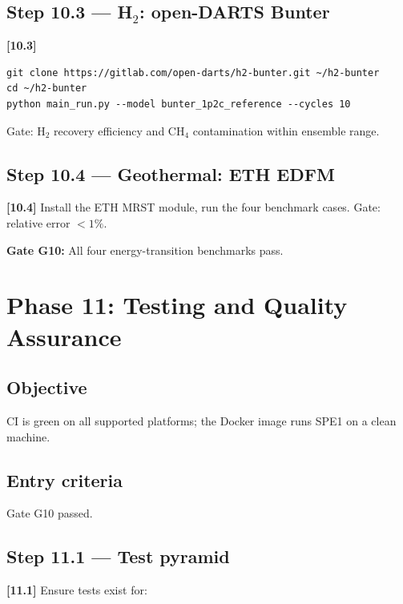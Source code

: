 \documentclass[10pt,a4paper]{article}
\newcommand{\stepID}[1]{\textsf{\textbf{[#1]}}}
\begin{document}
\subsection{Step 10.3 --- H$_2$: open-DARTS Bunter}

\stepID{10.3}
\begin{lstlisting}[style=sh]
git clone https://gitlab.com/open-darts/h2-bunter.git ~/h2-bunter
cd ~/h2-bunter
python main_run.py --model bunter_1p2c_reference --cycles 10
\end{lstlisting}

Gate: H$_2$ recovery efficiency and CH$_4$ contamination within ensemble range.

\subsection{Step 10.4 --- Geothermal: ETH EDFM}

\stepID{10.4} Install the ETH MRST module, run the four benchmark cases. Gate: relative error $<1\%$.

\begin{gate}
\textbf{Gate G10:} All four energy-transition benchmarks pass.
\end{gate}

\section{Phase 11: Testing and Quality Assurance}
\label{sec:phase11}

\subsection{Objective}
CI is green on all supported platforms; the Docker image runs SPE1 on a clean machine.

\subsection{Entry criteria}
Gate G10 passed.

\subsection{Step 11.1 --- Test pyramid}

\stepID{11.1} Ensure tests exist for:
\end{document}
